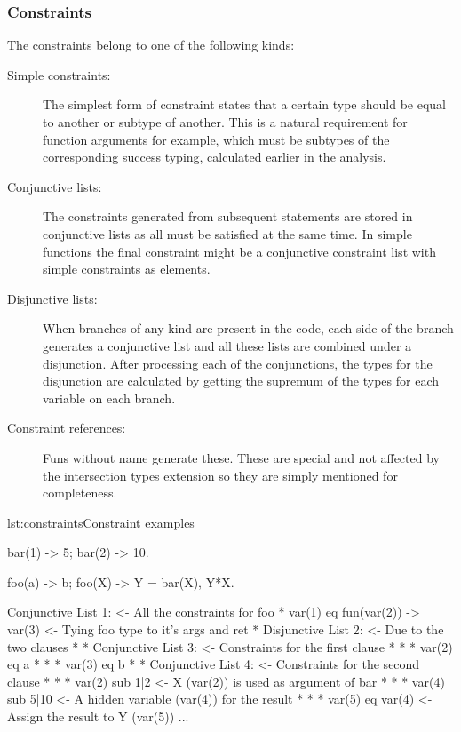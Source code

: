 \subsubsection{Constraints}
\label{sct:orig_constraints}

The constraints belong to one of the following kinds:
\begin{description}
\item[Simple constraints:] The simplest form of constraint states that
  a certain type should be equal to another or subtype of
  another. This is a natural requirement for function arguments for
  example, which must be subtypes of the corresponding success typing,
  calculated earlier in the analysis.
\item[Conjunctive lists:] The constraints generated from subsequent
  statements are stored in conjunctive lists as all must be satisfied
  at the same time. In simple functions the final constraint might be
  a conjunctive constraint list with simple constraints as elements.
\item[Disjunctive lists:] When branches of any kind are present in the
  code, each side of the branch generates a conjunctive list and all
  these lists are combined under a disjunction. After processing each
  of the conjunctions, the types for the disjunction are calculated by
  getting the supremum of the types for each variable on each branch.
\item[Constraint references:] Funs without name generate these. These
  are special and not affected by the intersection types extension so
  they are simply mentioned for completeness.
\end{description}

\begin{console}{lst:constraints}{Constraint examples}

bar(1) -> 5;
bar(2) -> 10.

foo(a) -> b;
foo(X) ->
  Y = bar(X),
  Y*X.


Conjunctive List 1:                <- All the constraints for foo
 * var(1) eq fun(var(2)) -> var(3) <- Tying foo type to it's args and ret
 * Disjunctive List 2:             <- Due to the two clauses
 *  * Conjunctive List 3:          <- Constraints for the first clause
 *  *  * var(2) eq a
 *  *  * var(3) eq b
 *  * Conjunctive List 4:          <- Constraints for the second clause
 *  *  * var(2) sub 1|2            <- X (var(2)) is used as argument of bar
 *  *  * var(4) sub 5|10           <- A hidden variable (var(4)) for the result
 *  *  * var(5) eq var(4)          <- Assign the result to Y (var(5))
 ...
\end{console}

